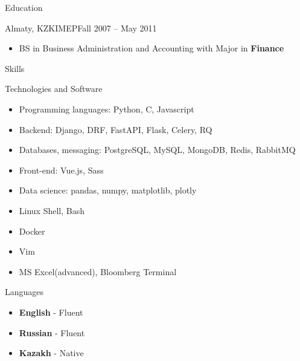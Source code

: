 \documentclass[]{mcdowellcv}
\begin{document}
\pagebreak

\begin{cvsection}{Education}
  \begin{cvsubsection}{Almaty, KZ}{KIMEP}{Fall 2007 -- May 2011}
    \begin{itemize}
      \item BS in Business Administration and Accounting with Major in \textbf{Finance}
    \end{itemize}
  \end{cvsubsection}
\end{cvsection}

\begin{cvsection}{Skills}
  \begin{cvsubsection}{Technologies and Software}{}{}	
      \begin{itemize}
	\item Programming languages: Python, C, Javascript
	\item Backend:  Django, DRF, FastAPI, Flask, Celery, RQ
	\item Databases, messaging: PostgreSQL, MySQL, MongoDB, Redis, RabbitMQ
        \item Front-end: Vue.js, Sass
        \item Data science: pandas, numpy, matplotlib, plotly
	\item Linux Shell, Bash
	\item Docker
        \item Vim
        \item MS Excel(advanced), Bloomberg Terminal
      \end{itemize}
  \end{cvsubsection}
  \begin{cvsubsection}{Languages}{}{}	
    \begin{itemize}
      \item \textbf{English} - Fluent
      \item \textbf{Russian} - Fluent
      \item \textbf{Kazakh} - Native
    \end{itemize}
  \end{cvsubsection}
\end{cvsection}
\end{document}
